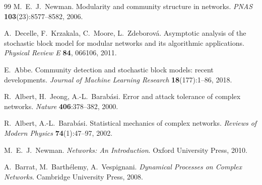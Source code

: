 \documentclass[11pt,a4paper]{article}
\theoremstyle{plain}
\theoremstyle{definition}
\theoremstyle{remark}
\begin{document}
\begin{thebibliography}{99}
M.~E.~J.~Newman.
\newblock Modularity and community structure in networks.
\newblock \emph{PNAS} \textbf{103}(23):8577--8582, 2006.

A.~Decelle, F.~Krzakala, C.~Moore, L.~Zdeborov\'a.
\newblock Asymptotic analysis of the stochastic block model for modular networks
and its algorithmic applications.
\newblock \emph{Physical Review E} \textbf{84}, 066106, 2011.

E.~Abbe.
\newblock Community detection and stochastic block models: recent developments.
\newblock \emph{Journal of Machine Learning Research} \textbf{18}(177):1--86, 2018.

R.~Albert, H.~Jeong, A.-L.~Barab\'asi.
\newblock Error and attack tolerance of complex networks.
\newblock \emph{Nature} \textbf{406}:378--382, 2000.

R.~Albert, A.-L.~Barab\'asi.
\newblock Statistical mechanics of complex networks.
\newblock \emph{Reviews of Modern Physics} \textbf{74}(1):47--97, 2002.

M.~E.~J.~Newman.
\newblock \emph{Networks: An Introduction}.
\newblock Oxford University Press, 2010.

A.~Barrat, M.~Barth\'elemy, A.~Vespignani.
\newblock \emph{Dynamical Processes on Complex Networks}.
\newblock Cambridge University Press, 2008.

\end{thebibliography}
\end{document}
